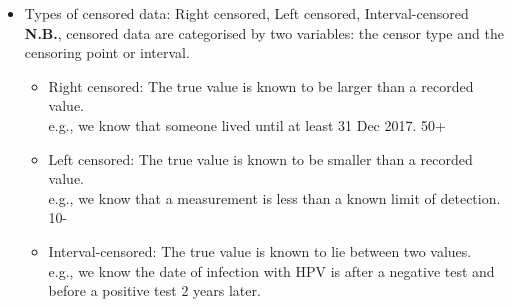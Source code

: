 \documentclass[12pt]{book}
\begin{document}
\begin{itemize}
\item Types of censored data: Right censored, Left censored, Interval-censored \\
\textbf{N.B.}, censored data are categorised by two variables: the censor type and the censoring point or interval.
\begin{itemize}
\item Right censored: The true value is known to be larger than a recorded value. \\
e.g., we know that someone lived until at least 31 Dec 2017. 50+
\item Left censored: The true value is known to be smaller than a recorded value. \\
e.g., we know that a measurement is less than a known limit of detection. 10-
\item Interval-censored: The true value is known to lie between two values. \\
e.g., we know the date of infection with HPV is after a negative test and before a positive test 2 years later.
\end{itemize}
\end{itemize}
\end{document}
